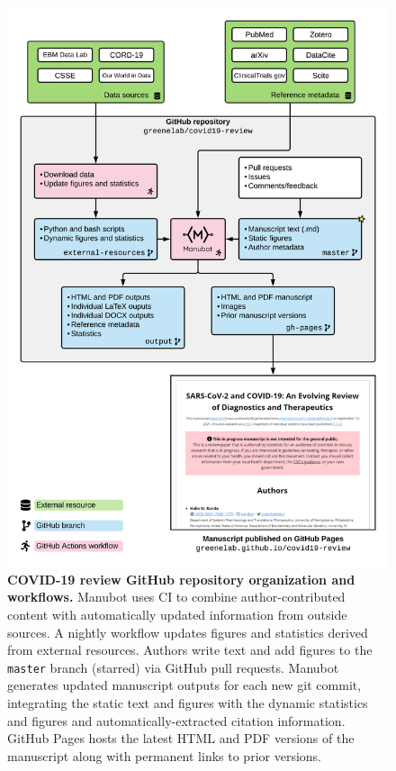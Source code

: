 \documentclass[twocolumn]{ceurart}
\begin{document}
\begin{figure}
\hypertarget{fig:manubot-workflow}{%
\centering
\includegraphics{images/covid-19-review-workflow-figure.png}
\caption{\textbf{COVID-19 review GitHub repository organization and workflows.}
Manubot uses CI to combine author-contributed content with automatically updated information from outside sources.
A nightly workflow updates figures and statistics derived from external resources.
Authors write text and add figures to the \texttt{master} branch (starred) via GitHub pull requests.
Manubot generates updated manuscript outputs for each new git commit, integrating the static text and figures with the dynamic statistics and figures and automatically-extracted citation information.
GitHub Pages hosts the latest HTML and PDF versions of the manuscript along with permanent links to prior versions.}\label{fig:manubot-workflow}
}
\end{figure}
\end{document}
